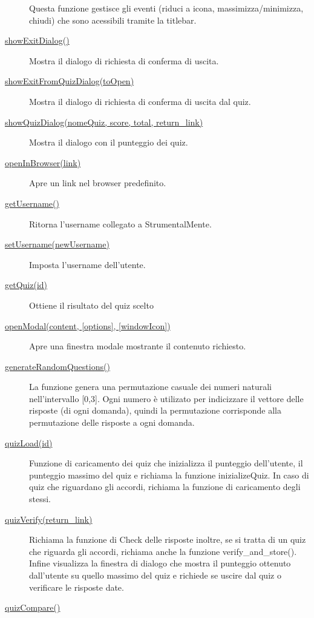 \begin{description}
Questa funzione gestisce gli eventi (riduci a icona,
massimizza/minimizza, chiudi) che sono acessibili tramite la titlebar.
\item[{ \protect\hyperlink{showExitDialog}{showExitDialog()} }]
Mostra il dialogo di richiesta di conferma di uscita.
\item[{
\protect\hyperlink{showExitFromQuizDialog}{showExitFromQuizDialog(toOpen)}
}]
Mostra il dialogo di richiesta di conferma di uscita dal quiz.
\item[{ \protect\hyperlink{showQuizDialog}{showQuizDialog(nomeQuiz,
score, total, return\_link)} }]
Mostra il dialogo con il punteggio dei quiz.
\item[{ \protect\hyperlink{openInBrowser}{openInBrowser(link)} }]
Apre un link nel browser predefinito.
\item[{ \protect\hyperlink{getUsername}{getUsername()} }]
Ritorna l'username collegato a StrumentalMente.
\item[{ \protect\hyperlink{setUsername}{setUsername(newUsername)} }]
Imposta l'username dell'utente.
\item[{ \protect\hyperlink{getQuiz}{getQuiz(id)} }]
Ottiene il risultato del quiz scelto
\item[{ \protect\hyperlink{openModal}{openModal(content, {[}options{]},
{[}windowIcon{]})} }]
Apre una finestra modale mostrante il contenuto richiesto.
\item[{
\protect\hyperlink{generateRandomQuestions}{generateRandomQuestions()}
}]
La funzione genera una permutazione casuale dei numeri naturali
nell'intervallo {[}0,3{]}. Ogni numero è utilizato per indicizzare il
vettore delle risposte (di ogni domanda), quindi la permutazione
corrisponde alla permutazione delle risposte a ogni domanda.
\item[{ \protect\hyperlink{quizLoad}{quizLoad(id)} }]
Funzione di caricamento dei quiz che inizializza il punteggio
dell'utente, il punteggio massimo del quiz e richiama la funzione
inizializeQuiz. In caso di quiz che riguardano gli accordi, richiama la
funzione di caricamento degli stessi.
\item[{ \protect\hyperlink{quizVerify}{quizVerify(return\_link)} }]
Richiama la funzione di Check delle risposte inoltre, se si tratta di un
quiz che riguarda gli accordi, richiama anche la funzione
verify\_and\_store(). Infine visualizza la finestra di dialogo che
mostra il punteggio ottenuto dall'utente su quello massimo del quiz e
richiede se uscire dal quiz o verificare le risposte date.
\item[{ \protect\hyperlink{quizCompare}{quizCompare()} }]

\end{description}
